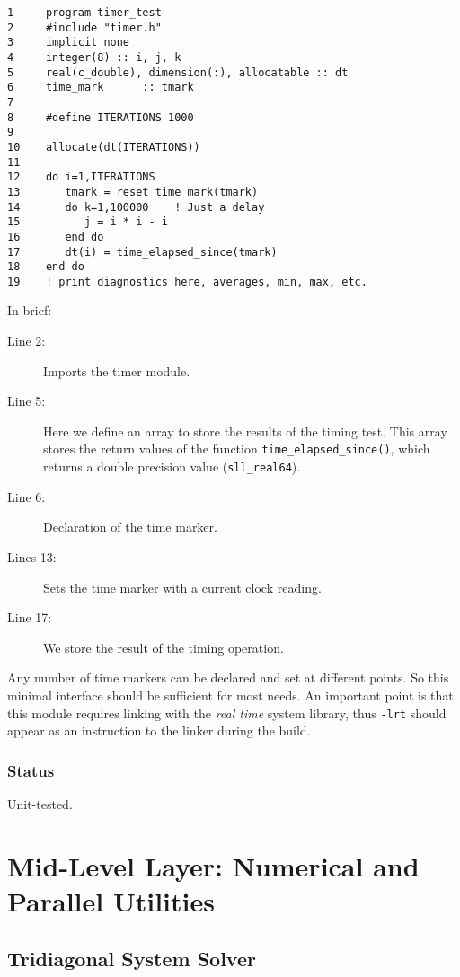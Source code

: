 \documentclass[]{report}   %
\begin{document}
\begin{verbatim}
1     program timer_test
2     #include "timer.h"
3     implicit none
4     integer(8) :: i, j, k
5     real(c_double), dimension(:), allocatable :: dt
6     time_mark      :: tmark
7
8     #define ITERATIONS 1000
9 
10    allocate(dt(ITERATIONS))
11
12    do i=1,ITERATIONS
13       tmark = reset_time_mark(tmark)
14       do k=1,100000    ! Just a delay
15          j = i * i - i
16       end do
17       dt(i) = time_elapsed_since(tmark) 
18    end do
19    ! print diagnostics here, averages, min, max, etc.
\end{verbatim}

In brief:
\begin{description}
\item[Line 2:]
Imports the timer module. 

\item[Line 5:]
Here we define an array to store the results of the timing test. This array stores the return values of the function \verb+time_elapsed_since()+, which returns a double precision value (\verb+sll_real64+).

\item[Line 6: ]
Declaration of the time marker.

\item[Lines 13:]
Sets the time marker with a current clock reading.

\item[Line 17:]
We store the result of the timing operation.
\end{description}

Any number of time markers can be declared and set at different points. So this minimal interface should be sufficient for most needs. An important point is that this module requires linking with the \emph{real time} system library, thus \verb+-lrt+ should appear as an instruction to the linker during the build.

\subsection{Status}
Unit-tested.


\chapter{Mid-Level Layer: Numerical and Parallel Utilities}

\section{Tridiagonal System Solver}
\end{document}
